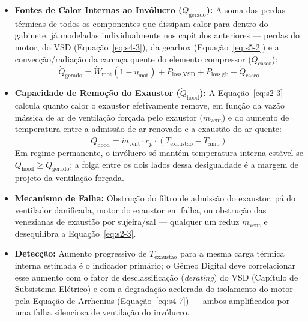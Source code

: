 \documentclass[12pt,a4paper]{article}
\numberwithin{equation}{section}
\numberwithin{table}{section}
\numberwithin{figure}{section}
\begin{document}
	\begin{itemize}
		\item \textbf{Fontes de Calor Internas ao Invólucro ($\dot{Q}_{\text{gerado}}$):} A soma das perdas térmicas de todos os componentes que dissipam calor para dentro do gabinete, já modeladas individualmente nos capítulos anteriores — perdas do motor, do VSD (Equação~\eqref{eq:s4-3}), da gearbox (Equação~\eqref{eq:s5-2}) e a convecção/radiação da carcaça quente do elemento compressor ($\dot{Q}_{\text{casco}}$):
		\begin{equation}\label{eq:s2-2}
\dot{Q}_{\text{gerado}} = \dot{W}_{\text{mot}}(1 - \eta_{\text{mot}}) + P_{\text{loss,VSD}} + P_{\text{loss,gb}} + \dot{Q}_{\text{casco}}
\end{equation}
		\item \textbf{Capacidade de Remoção do Exaustor ($\dot{Q}_{\text{hood}}$):} A Equação~\eqref{eq:s2-3} calcula quanto calor o exaustor efetivamente remove, em função da vazão mássica de ar de ventilação forçada pelo exaustor ($\dot{m}_{\text{vent}}$) e do aumento de temperatura entre a admissão de ar renovado e a exaustão do ar quente:
		\begin{equation}\label{eq:s2-3}
\dot{Q}_{\text{hood}} = \dot{m}_{\text{vent}} \cdot c_p \cdot (T_{\text{exaustão}} - T_{\text{amb}})
\end{equation}
		Em regime permanente, o invólucro só mantém temperatura interna estável se $\dot{Q}_{\text{hood}} \ge \dot{Q}_{\text{gerado}}$; a folga entre os dois lados dessa desigualdade é a margem de projeto da ventilação forçada.
		\item \textbf{Mecanismo de Falha:} Obstrução do filtro de admissão do exaustor, pá do ventilador danificada, motor do exaustor em falha, ou obstrução das venezianas de exaustão por sujeira/sal — qualquer um reduz $\dot{m}_{\text{vent}}$ e desequilibra a Equação~\eqref{eq:s2-3}.
		\item \textbf{Detecção:} Aumento progressivo de $T_{\text{exaustão}}$ para a mesma carga térmica interna estimada é o indicador primário; o Gêmeo Digital deve correlacionar esse aumento com o fator de desclassificação (\textit{derating}) do VSD (Capítulo de Subsistema Elétrico) e com a degradação acelerada do isolamento do motor pela Equação de Arrhenius (Equação~\eqref{eq:s4-7}) — ambos amplificados por uma falha silenciosa de ventilação do invólucro.
	\end{itemize}
\end{document}
